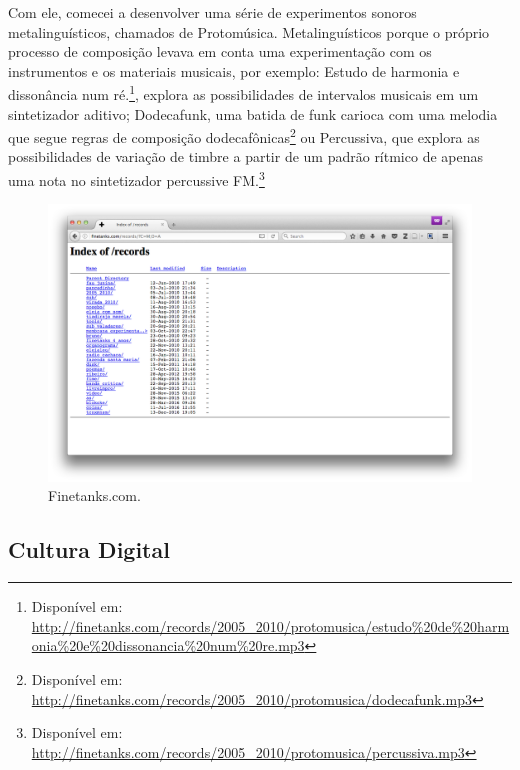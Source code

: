 Com ele, comecei a desenvolver uma série de experimentos sonoros metalinguísticos, chamados de Protomúsica. Metalinguísticos porque o próprio processo de composição levava em conta uma experimentação com os instrumentos e os materiais musicais, por exemplo:
Estudo de harmonia e dissonância num ré.\footnote{Disponível em: \url{http://finetanks.com/records/2005_2010/protomusica/estudo\%20de\%20harmonia\%20e\%20dissonancia\%20num\%20re.mp3}}, explora as possibilidades de intervalos musicais em um sintetizador aditivo;
Dodecafunk, uma batida de funk carioca com uma melodia que segue regras de composição dodecafônicas\footnote{Disponível em: \url{http://finetanks.com/records/2005_2010/protomusica/dodecafunk.mp3}} ou
Percussiva, que explora as possibilidades de variação de timbre a partir de um padrão rítmico de apenas uma nota no sintetizador percussive FM.\footnote{Disponível em: \url{http://finetanks.com/records/2005_2010/protomusica/percussiva.mp3}}



\begin{figure}

\includegraphics[width=1\textwidth]{pictures/cap1/finetanksrecords}
\caption{Finetanks.com.}
\label{fig:finetanks}
\end{figure}




\subsection{Cultura Digital}


